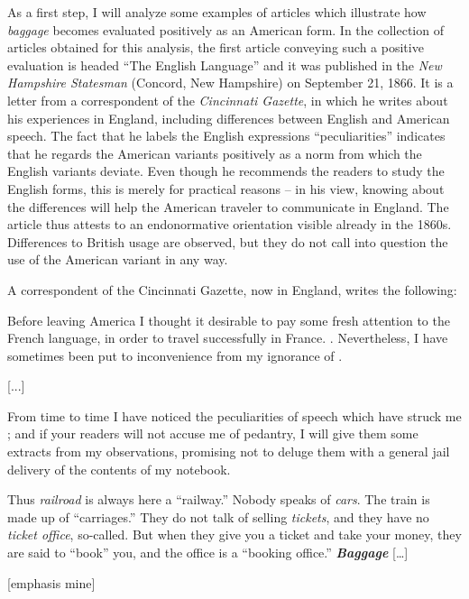 As a first step, I will analyze some examples of articles which illustrate how \emph{baggage} becomes evaluated positively as an American form. In the collection of articles obtained for this analysis, the first article conveying such a positive evaluation is headed “The English Language” and it was published in the \emph{New Hampshire Statesman} (Concord, New Hampshire) on September 21, 1866. It is a letter from a correspondent of the \emph{Cincinnati Gazette}, in which he writes about his experiences in England, including differences between English and American speech. The fact that he labels the English expressions “peculiarities” indicates that he regards the American variants positively as a norm from which the English variants deviate. Even though he recommends the readers to study the English forms, this is merely for practical reasons – in his view, knowing about the differences will help the American traveler to communicate in England. The article thus attests to an endonormative orientation visible already in the 1860s. Differences to British usage are observed, but they do not call into question the use of the American variant in any way.

\begin{ipquote}
\begin{center}
\end{center}
A correspondent of the Cincinnati Gazette, now in England, writes the following:

{Before leaving America I thought it desirable to pay some fresh attention to the French language, in order to travel successfully in France. . Nevertheless, I have sometimes been put to inconvenience from my ignorance of .

\centering
{[...]}

From time to time I have noticed the peculiarities of speech which have struck me ; and if your readers will not accuse me of pedantry, I will give them some extracts from my observations, promising not to deluge them with a general jail delivery of the contents of my notebook.}

{ Thus \textit{railroad} is always here a “railway.” Nobody speaks of \textit{cars}. The train is made up of “carriages.” They do not talk of selling \textit{tickets}, and they have no \textit{ticket office}, so-called. But when they give you a ticket and take your money, they are said to “book” you, and the office is a “booking office.” \textit{\textbf{Baggage}}  […]

\raggedleft
{[emphasis mine]}\\
}
\end{ipquote}

